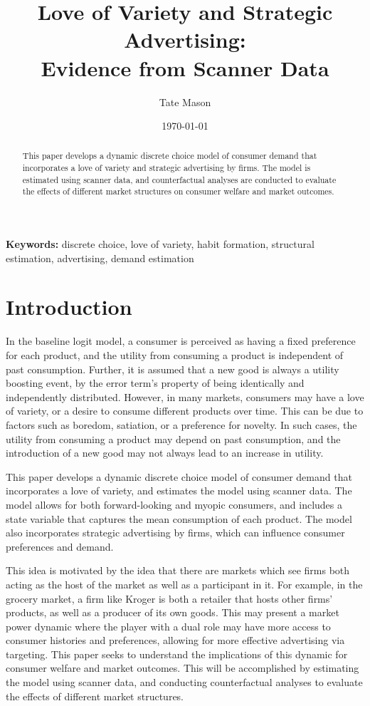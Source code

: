 \documentclass[12pt]{article}
\title{\textbf{Love of Variety and Strategic Advertising:\\
               Evidence from Scanner Data}}
\author[1]{Tate Mason}
\affil[1]{John Munro Godfrey Sr. Department of Economics, University of Georgia}
\date{\today}
\begin{document}
\maketitle

\begin{abstract}
This paper develops a dynamic discrete choice model of consumer demand that incorporates a love of variety and strategic advertising by firms. The model is estimated using scanner data, and counterfactual analyses are conducted to evaluate the effects of different market structures on consumer welfare and market outcomes.
\end{abstract}

\noindent\textbf{Keywords:} discrete choice, love of variety, habit formation,
                             structural estimation, advertising, demand estimation

\newpage

\section{Introduction}

In the baseline logit model, a consumer is perceived as having a fixed preference for each product, and the utility from consuming a product is independent of past consumption. Further, it is assumed that a new good is always a utility boosting event, by the error term's property of being identically and independently distributed. However, in many markets, consumers may have a love of variety, or a desire to consume different products over time. This can be due to factors such as boredom, satiation, or a preference for novelty. In such cases, the utility from consuming a product may depend on past consumption, and the introduction of a new good may not always lead to an increase in utility.

This paper develops a dynamic discrete choice model of consumer demand that incorporates a love of variety, and estimates the model using scanner data. The model allows for both forward-looking and myopic consumers, and includes a state variable that captures the mean consumption of each product. The model also incorporates strategic advertising by firms, which can influence consumer preferences and demand.

This idea is motivated by the idea that there are markets which see firms both acting as the host of the market as well as a participant in it. For example, in the grocery market, a firm like Kroger is both a retailer that hosts other firms' products, as well as a producer of its own goods. This may present a market power dynamic where the player with a dual role may have more access to consumer histories and preferences, allowing for more effective advertising via targeting. This paper seeks to understand the implications of this dynamic for consumer welfare and market outcomes. This will be accomplished by estimating the model using scanner data, and conducting counterfactual analyses to evaluate the effects of different market structures.
\end{document}
